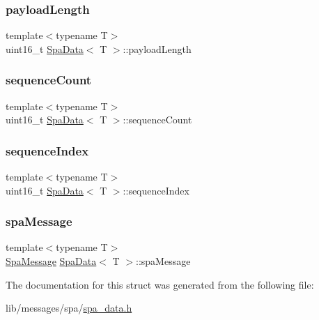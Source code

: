 \mbox{\label{structSpaData_a9a13479cc5d5fe7d648a4676f558bd5d}} 
\subsubsection{\texorpdfstring{payload\+Length}{payloadLength}}
{\footnotesize\ttfamily template$<$typename T$>$ \\
uint16\+\_\+t \hyperlink{structSpaData}{Spa\+Data}$<$ T $>$\+::payload\+Length}

\mbox{\label{structSpaData_a8942336c812cd66dabc7f45fd7d43642}} 
\subsubsection{\texorpdfstring{sequence\+Count}{sequenceCount}}
{\footnotesize\ttfamily template$<$typename T$>$ \\
uint16\+\_\+t \hyperlink{structSpaData}{Spa\+Data}$<$ T $>$\+::sequence\+Count}

\mbox{\label{structSpaData_af73ab34cf6e29508bc8531a7846e39ef}} 
\subsubsection{\texorpdfstring{sequence\+Index}{sequenceIndex}}
{\footnotesize\ttfamily template$<$typename T$>$ \\
uint16\+\_\+t \hyperlink{structSpaData}{Spa\+Data}$<$ T $>$\+::sequence\+Index}

\mbox{\label{structSpaData_a92344b63fb9ae2e080c30d4810020170}} 
\subsubsection{\texorpdfstring{spa\+Message}{spaMessage}}
{\footnotesize\ttfamily template$<$typename T$>$ \\
\hyperlink{structSpaMessage}{Spa\+Message} \hyperlink{structSpaData}{Spa\+Data}$<$ T $>$\+::spa\+Message}



The documentation for this struct was generated from the following file\+:\begin{DoxyCompactItemize}
\item 
lib/messages/spa/\hyperlink{spa__data_8h}{spa\+\_\+data.\+h}\end{DoxyCompactItemize}
